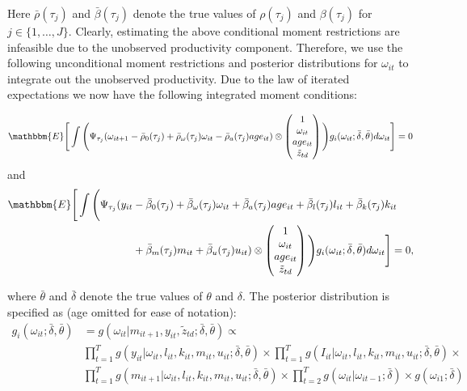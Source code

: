 \documentclass{article}
\begin{document}
Here $\bar{\rho}(\tau_{j})$ and $\bar{\beta}(\tau_{j})$ denote the true values of $\rho(\tau_{j})$ and $\beta(\tau_{j})$ for $j\in\{1,\dots, J\}$. Clearly, estimating the above conditional moment restrictions are infeasible due to the unobserved productivity component. Therefore, we use the following unconditional moment restrictions and posterior distributions for $\omega_{it}$ to integrate out the unobserved productivity. Due to the law of iterated expectations we now have the following integrated moment conditions:

\begin{equation}\label{omegaimc}
\mathbbm{E}\Bigg[\int\Bigg(\Psi_{\tau_{j}}(\omega_{it+1}-\bar{\rho}_{0}(\tau_{j})+\bar{\rho}_{\omega}(\tau_{j})\omega_{it}-\bar{\rho}_{a}(\tau_{j})age_{it})\otimes
\begin{pmatrix}
1 \\
\omega_{it}\\
age_{it}\\
\tilde{z}_{td}
\end{pmatrix}
\Bigg)g_{i}(\omega_{it};\bar{\delta},\bar{\theta})d\omega_{it}\Bigg]=0
\end{equation}
and 
\begin{equation}\label{yimc}
\begin{split}
\mathbbm{E}\Bigg[\int\Bigg(\Psi_{\tau_{j}}(y_{it}&-\bar{\beta}_{0}(\tau_{j})+\bar{\beta}_{\omega}(\tau_{j})\omega_{it}+\bar{\beta}_{a}(\tau_{j})age_{it}+\bar{\beta}_{l}(\tau_{j})l_{it}+\bar{\beta}_{k}(\tau_{j})k_{it}\\
&+\bar{\beta}_{m}(\tau_{j})m_{it}+\bar{\beta}_{u}(\tau_{j})u_{it})\otimes
\begin{pmatrix}
1 \\
\omega_{it}\\
age_{it}\\
\tilde{z}_{td}
\end{pmatrix}
\Bigg)g_{i}(\omega_{it};\bar{\delta},\bar{\theta})d\omega_{it}\Bigg]=0,
\end{split}
\end{equation}

where $\bar{\theta}$ and $\bar{\delta}$ denote the true values of $\theta$ and $\delta$. The posterior distribution is specified as (age omitted for ease of notation):
\begin{equation}\label{posterior}
\begin{split}
g_{i}(\omega_{it};\bar{\delta},\bar{\theta})&=g(\omega_{it}|m_{it+1}, y_{it}, \tilde{z}_{td}; \bar{\delta},\bar{\theta}) \propto\\
&\prod_{t=1}^{T}g(y_{it}|\omega_{it}, l_{it}, k_{it}, m_{it}, u_{it};\bar{\delta},\bar{\theta})\times
\prod_{t=1}^{T}g(I_{it}|\omega_{it}, l_{it}, k_{it}, m_{it}, u_{it};\bar{\delta},\bar{\theta})\times\\
&\prod_{t=1}^{T}g(m_{it+1}|\omega_{it}, l_{it}, k_{it}, m_{it}, u_{it};\bar{\delta},\bar{\theta})\times \prod_{t=2}^{T}g(\omega_{it}|\omega_{it-1};\bar{\delta})\times g(\omega_{i1};\bar{\delta})
\end{split}
\end{equation}
\end{document}
